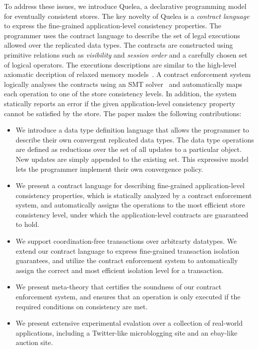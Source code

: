 To address these issues, we introduce Quelea, a declarative programming model
for eventually consistent stores. The key novelty of Quelea is a \emph{contract
language} to express the fine-grained application-level consistency properties.
The programmer uses the contract language to describe the set of legal
executions allowed over the replicated data types. The contracts are
constructed using primitive relations such as \emph{visibility} and
\emph{session order} and a carefully chosen set of logical operators. The
executions descriptions are similar to the high-level axiomatic decription of
relaxed memory models~\cite{Demange2013}. A contract enforcement system
logically analyses the contracts using an SMT solver~\cite{} and automatically
maps each operation to one of the store consistency levels. In addition, the
system statically reports an error if the given application-level consistency
property cannot be satisfied by the store. The paper makes the following
contributions:

\begin{itemize}

\item We introduce a data type definition language that allows the programmer
to describe their own convergent replicated data types. The data type
operations are defined as reductions over the set of all updates to a
particular object. New updates are simply appended to the existing set. This
expressive model lets the programmer implement their own convergence policy.

\item We present a contract language for describing fine-grained
application-level consistency properties, which is statically analyzed by a
contract enforcement system, and automatically assigns the operations to the
most efficient store consistency level, under which the application-level
contracts are guaranteed to hold.

\item We support coordination-free transactions over arbitrarty datatypes. We
extend our contract language to express fine-grained transaction isolation
guarantees, and utilize the contract enforcement system to automatically assign
the correct and most efficient isolation level for a transaction.

\item We present meta-theory that certifies the soundness of our contract
enforcement system, and ensures that an operation is only executed if the
required conditions on consistency are met.

\item We present extensive experimental evalation over a collection of
real-world applications, including a Twitter-like microblogging site and an
ebay-like auction site.

\end{itemize}

